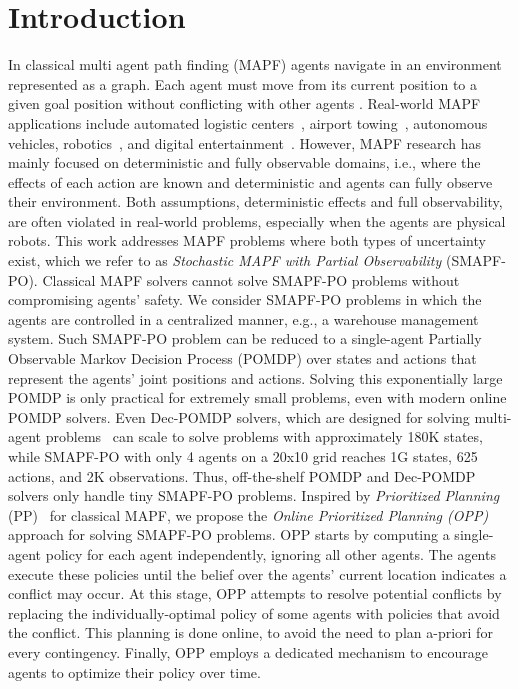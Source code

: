 \documentclass[letterpaper]{article} %
\begin{document}
\section{Introduction}
In classical multi agent path finding (MAPF) agents navigate in an environment represented as a graph.  Each agent must move from its current position to a given goal position without conflicting with other agents \cite{stern2019mapf}.
Real-world MAPF applications include automated logistic centers~\cite{wurman2008coordinating,salzman2020research}, airport towing~\cite{morris2016planning}, autonomous vehicles, robotics~\cite{veloso2015cobots}, and digital entertainment~\cite{ma2017feasibility}. However, MAPF research has mainly focused on deterministic and fully observable domains, i.e., where the effects of each action are known and deterministic and agents can fully observe their environment.
Both assumptions, deterministic effects and full observability, are often violated in real-world problems, especially when the agents are physical robots.
This work addresses MAPF problems where both types of uncertainty exist, which we refer to as \emph{Stochastic MAPF with Partial Observability} (SMAPF-PO).
Classical MAPF solvers cannot solve SMAPF-PO problems without compromising agents' safety.
We consider SMAPF-PO problems in which the agents are controlled in a centralized manner, e.g., a warehouse management system.
Such SMAPF-PO problem can be reduced to a single-agent Partially Observable Markov Decision Process (POMDP) over states and actions that represent the agents' joint positions and actions. Solving this exponentially large POMDP is only practical for extremely small problems, even with modern online POMDP solvers. Even Dec-POMDP solvers, which are designed for solving multi-agent problems~\cite{amato2019modeling} can scale to solve problems with approximately 180K states, while SMAPF-PO with only 4 agents on a 20x10 grid reaches 1G states, 625 actions, and 2K observations.
Thus, off-the-shelf POMDP and Dec-POMDP solvers only handle tiny SMAPF-PO problems.
Inspired by \emph{Prioritized Planning} (PP)~\cite{silver2005cooperative} for classical MAPF,
we propose the \emph{Online Prioritized Planning (OPP)} approach for solving SMAPF-PO problems.
OPP starts by computing a single-agent policy for each agent independently, ignoring all other agents.
The agents execute these policies until the belief over the agents' current location indicates a conflict may occur. %
At this stage, OPP attempts to resolve potential conflicts by replacing the individually-optimal policy of some agents with policies that avoid the conflict. This planning is done online, to avoid the need to plan a-priori for every contingency. Finally, OPP employs a dedicated mechanism to encourage agents to optimize their policy over time.
\end{document}
